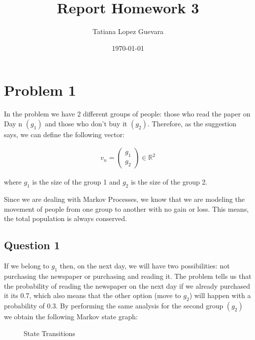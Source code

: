 \documentclass{article}
\begin{document}
\title{Report Homework 3}
\date {\today}
\author{Tatiana Lopez Guevara}
\maketitle

\section{Problem 1}

In the problem we have 2 different groups of people: those who read the paper on Day n $(g_1)$ 
and those who don't buy it $(g_2)$. 
Therefore, as the suggestion says, we can define the following
vector:

\begin{equation*}
\begin{aligned}
v_n = 
\left(
\begin{array}{c}
g_1\\ 
g_2
 \end{array}
 \right)
 \in
 \mathbb{R}^2
\end{aligned}
\end{equation*} 

where $g_1$ is the size of the group 1 and $g_2$ is the size of the group 2.

Since we are dealing with Markov Processes, we know that we are modeling the
movement of people from one group to another with no gain or loss. This means,
 the total population is always conserved.

\subsection{Question 1}

If we belong to $g_1$ then, on the next day, we will have two possibilities:
not purchasing the newspaper or purchasing and reading it. 
The problem tells us that the probability of reading the newspaper on the next day
if we already purchased it its 0.7, which also means that the other option 
(move to $g_2$) will happen with a probability of 0.3.
By performing the same analysis for the second group $(g_2)$ we obtain the 
following Markov state graph:

\begin{figure}[H]
\begin{center}
\end{center}
\caption{State Transitions}
\label{fig:mg}
\end{figure}
\end{document}
